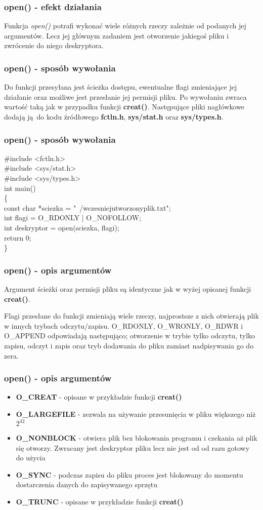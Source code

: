 \documentclass{beamer}
\begin{document}
\begin{frame}
	\frametitle{open() - efekt działania}
Funkcja \textit{open()} potrafi wykonać wiele różnych rzeczy zależnie od podanych jej argumentów.
Lecz jej głównym zadaniem jest otworzenie jakiegoś pliku i zwrócenie do niego deskryptora.
\end{frame}

\begin{frame}
	\frametitle{open() - sposób wywołania}
Do funkcji przesyłana jest ścieżka dostępu, ewentualne flagi zmieniające jej działanie oraz możliwe jest przesłanie jej permisji pliku.
Po wywołaniu zwraca wartość taką jak w przypadku funkcji \textbf{creat()}.
Następujące pliki nagłówkowe dodają ją do kodu źródłowego \textbf{fctln.h}, \textbf{sys/stat.h} oraz \textbf{sys/types.h}.
\end{frame}

\begin{frame}
	\frametitle{open() - sposób wywołania}
\#include <fctln.h>\\
\#include <sys/stat.h>\\
\#include <sys/types.h>\\
int main()\\
\{\\
	const char *sciezka = "~/wczesniejutworzonyplik.txt";\\
	int flagi = O\_RDONLY | O\_NOFOLLOW;\\
	int deskryptor = open(sciezka, flagi);\\
	return 0;\\
\}
\end{frame}

\begin{frame}
	\frametitle{open() - opis argumentów}
Argument ścieżki oraz permisji pliku są identyczne jak w wyżej opisanej funkcji \textbf{creat()}.

Flagi przesłane do funkcji zmieniają wiele rzeczy, najprostsze z nich otwierają plik w innych trybach odczytu/zapisu.
O\_RDONLY, O\_WRONLY, O\_RDWR i O\_APPEND odpowiadają następująco; otworzenie w trybie tylko odczytu, tylko zapisu, odczyt i zapis oraz tryb dodawania do pliku zamiast nadpisywania go do zera.
\end{frame}

\begin{frame}
	\frametitle{open() - opis argumentów}
\begin{itemize}
\item \textbf{O\_CREAT} - opisane w przykładzie funkcji \textbf{creat()}
\item \textbf{O\_LARGEFILE} - zezwala na używanie przesunięcia w pliku większego niż $2^{32}$
\item \textbf{O\_NONBLOCK} - otwiera plik bez blokowania programu i czekania aż plik się otworzy. Zwracany jest deskryptor pliku lecz nie jest od od razu gotowy do użycia
\item \textbf{O\_SYNC} - podczas zapisu do pliku proces jest blokowany do momentu dostarczenia danych do zapisywanego sprzętu
\item \textbf{O\_TRUNC} - opisane w przykładzie funkcji \textbf{creat()}
\end{itemize}
\end{frame}
\end{document}

